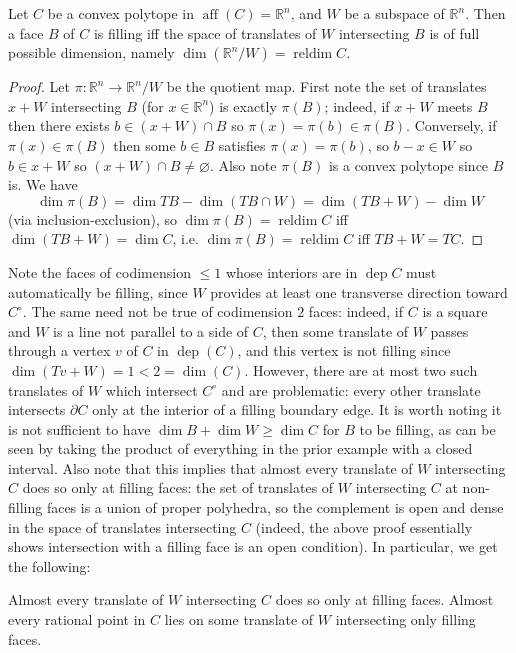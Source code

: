 \documentclass[12pt]{article}
\newcommand{\R}{\mathbb{R}}
\newcommand{\del}{\partial}
\DeclareMathOperator{\dep}{dep}
\DeclareMathOperator{\aff}{aff}
\DeclareMathOperator{\reldim}{reldim}
\renewcommand{\emptyset}{\varnothing}
\renewcommand{\le}{\leqslant}
\renewcommand{\ge}{\geqslant}
\theoremstyle{nonumberdefinition}
\theoremstyle{empty}
\theoremstyle{empty}
\begin{document}
\begin{lemma}\label{lem:parallelSlicesOfConvex}
	Let $C$ be a convex polytope in $\aff(C) = \R^n$, and $W$ be a subspace of $\R^n$. Then a face $B$ of $C$ is filling iff the space of translates of $W$ intersecting $B$ is of full possible dimension, namely $\dim(\R^n / W) = \reldim C$.
\end{lemma}
\begin{proof}
	Let $\pi \colon \R^n \to \R^n / W$ be the quotient map. First note the set of translates $x + W$ intersecting $B$ (for $x \in \R^n$) is exactly $\pi(B)$; indeed, if $x + W$ meets $B$ then there exists $b \in (x+W)\cap B$ so $\pi(x) = \pi(b) \in \pi(B)$. Conversely, if $\pi(x) \in \pi(B)$ then some $b \in B$ satisfies $\pi(x) = \pi(b)$, so $b - x \in W$ so $b \in x + W$ so $(x+W)\cap B \neq \emptyset$. Also note $\pi(B)$ is a convex polytope since $B$ is. We have \[\dim \pi(B) = \dim TB - \dim (TB \cap W) = \dim (TB + W) - \dim W\] (via inclusion-exclusion), so $\dim \pi(B) = \reldim C$ iff $\dim (TB + W) = \dim C$, i.e.  $\dim \pi(B) = \reldim C$ iff $TB + W = TC$.
\end{proof}

Note the faces of codimension $\le 1$ whose interiors are in $\dep C$ must automatically be filling, since $W$ provides at least one transverse direction toward $C^\circ$. The same need not be true of codimension $2$ faces: indeed, if $C$ is a square and $W$ is a line not parallel to a side of $C$, then some translate of $W$ passes through a vertex $v$ of $C$ in $\dep(C)$, and this vertex is not filling since $\dim(Tv+W) = 1 < 2 = \dim(C)$. However, there are at most two such translates of $W$ which intersect $C^\circ$ and are problematic: every other translate intersects $\del C$ only at the interior of a filling boundary edge. It is worth noting it is not sufficient to have $\dim B + \dim W \ge \dim C$ for $B$ to be filling, as can be seen by taking the product of everything in the prior example with a closed interval. Also note that this implies that almost every translate of $W$ intersecting $C$ does so only at filling faces: the set of translates of $W$ intersecting $C$ at non-filling faces is a union of proper polyhedra, so the complement is open and dense in the space of translates intersecting $C$ (indeed, the above proof essentially shows intersection with a filling face is an open condition). In particular, we get the following:

\begin{corollary}
	Almost every translate of $W$ intersecting $C$ does so only at filling faces. Almost every rational point in $C$ lies on some translate of $W$ intersecting only filling faces.
\end{corollary}
\end{document}
